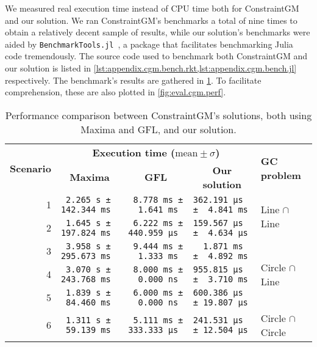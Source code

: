 We measured real execution time instead of \ac{CPU} time both for ConstraintGM
and our solution.  We ran ConstraintGM's benchmarks a total of nine times to
obtain a relatively decent sample of results, while our solution's benchmarks
were aided by \texttt{BenchmarkTools.jl}~\cite{Chen:2016:BenchmarkTools.jl}, a
package that facilitates benchmarking Julia code tremendously.  The source code
used to benchmark both ConstraintGM and our solution is listed in
\cref{lst:appendix.cgm.bench.rkt,lst:appendix.cgm.bench.jl} respectively.  The
benchmark's results are gathered in \cref{tab:eval.cgm.perf}.  To facilitate
comprehension, these are also plotted in \cref{fig:eval.cgm.perf}.

\begin{table}[htb]
  \caption[ConstraintGM performance benchmarks]{\label{tab:eval.cgm.perf}%
    Performance comparison between ConstraintGM's solutions, both using Maxima
    and \ac{GFL}, and our solution.}
  \footnotesize\centering
  \begin{tabular*}{\linewidth}{r*{3}{l}l}
    \toprule
    \multirow{2}{*}{\textbf{Scenario}}
    & \multicolumn{3}{c}{\textbf{Execution time ($\mathrm{mean}\pm\sigma$)}}
    & \multirow{2}{*}{\textbf{GC problem}} \\
    & \multicolumn{1}{c}{\textbf{Maxima}}
    & \multicolumn{1}{c}{\textbf{GFL}}
    & \multicolumn{1}{c}{\textbf{Our solution}} & \\
    \midrule
     1 & \texttt{~2.265 s ± 142.344 ms}
       & \texttt{~8.778 ms ± ~~1.641 ms}
       & \texttt{362.191 μs ± ~4.841 ms}
       & \multirow{2}{*}{Line $\cap$ Line}\\
     2 & \texttt{~1.645 s ± 197.824 ms}
       & \texttt{~6.222 ms ± 440.959 μs}
       & \texttt{159.567 μs ± ~4.634 μs} &\\
    \midrule
     3 & \texttt{~3.958 s ± 295.673 ms}
       & \texttt{~9.444 ms ± ~~1.333 ms}
       & \texttt{~~1.871 ms ± ~4.892 ms} 
       & \multirow{3}{*}{Circle $\cap$ Line}\\
     4 & \texttt{~3.070 s ± 243.768 ms}
       & \texttt{~8.000 ms ± ~~0.000 ns}
       & \texttt{955.815 μs ± ~3.710 ms} &\\
     5 & \texttt{~1.839 s ± ~84.460 ms}
       & \texttt{~6.000 ms ± ~~0.000 ns}
       & \texttt{600.386 μs ± 19.807 μs} &\\
    \midrule
     6 & \texttt{~1.311 s ± ~59.139 ms}
       & \texttt{~5.111 ms ± 333.333 μs}
       & \texttt{241.531 μs ± 12.504 μs} 
       & \multirow{8}{*}{Circle $\cap$ Circle}\\

\end{tabular*}
\end{table}

